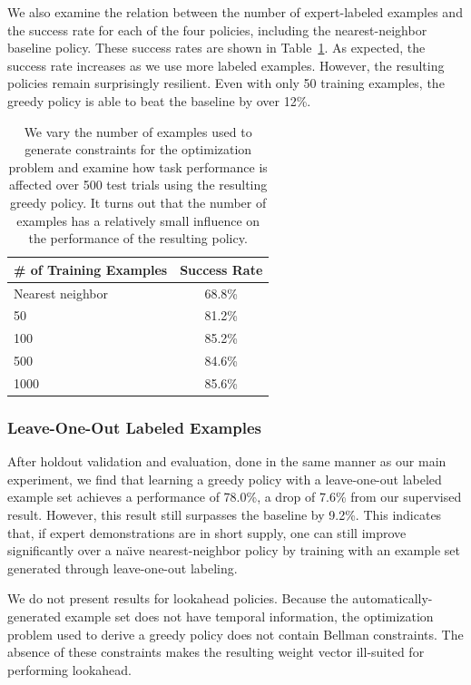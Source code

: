 We also examine the relation between the number of expert-labeled examples and
the success rate for each of the four policies, including the nearest-neighbor
baseline policy.  These success rates are shown in
Table~\ref{table:number_examples}.  As expected, the success rate increases as
we use more labeled examples. However, the resulting policies remain
surprisingly resilient. Even with only 50 training examples, the greedy policy is able to beat the baseline by over 12\%.

\begin{table}
  \centering
  \begin{tabular}{lc}
    \toprule
      \# of Training Examples & Success Rate\\
    \midrule
      Nearest neighbor \cite{Schulmanetal_ISRR2013} & 68.8\% \\
    \midrule
      50 & 81.2\% \\
      100 & 85.2\% \\
      500 & 84.6\% \\
      1000 & 85.6\%\\
    \bottomrule
  \end{tabular}
  \caption{We vary the number of examples used to generate constraints for the
    \mmql{} optimization problem and examine how task performance is affected
    over 500 test trials using the resulting greedy policy. It turns out that
    the number of examples has a relatively small influence on the performance
    of the resulting policy.}
  \label{table:number_examples}
\end{table}

\subsubsection{Leave-One-Out Labeled Examples}

After holdout validation and evaluation, done in the same manner as our main
experiment, we find that learning a greedy policy with a leave-one-out labeled
example set achieves a performance of 78.0\%, a drop of 7.6\% from our
supervised result. However, this result still surpasses the baseline by
9.2\%. This indicates that, if expert demonstrations are in short supply, one
can still improve significantly over a na\"{\i}ve nearest-neighbor policy by
training with an example set generated through leave-one-out labeling.

We do not present results for lookahead policies. Because the
automatically-generated example set does not have temporal information, the
optimization problem used to derive a greedy policy does not contain Bellman
constraints. The absence of these constraints makes the resulting weight vector
ill-suited for performing lookahead.
